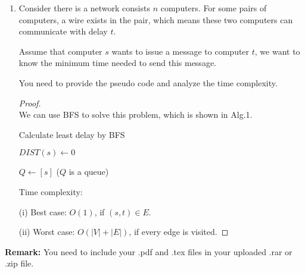 \documentclass[12pt,a4paper]{article}
\theoremstyle{definition}
\begin{document}
\begin{enumerate}
\begin{proof}
       If $(u,v)\in$ E, assume that we first visit $v$.
       
       If $u$ is not visited before, then $PRE(u)\textgreater PRE(v)$ and $POST(v)\textgreater PRE(u)$ since we call $EXPLORE(G,u)$ in $EXPLORE(G,v)$. So $[PRE(u),POST(u)]$ is contained  within    
       
       $[PRE(v),POST(v)]$.
       
       We can get the same conclusion when $u$ is visited first. So the lemma is proved.
    \end{proof}
\item
Consider there is a network consists $n$ computers. For some pairs of computers, a wire exists in the pair, which means these two computers can communicate with delay $t$.\par
Assume that computer $s$ wants to issue a message to computer $t$, we want to know the minimum time needed to send this message.\par
You need to provide the pseudo code and analyze the time complexity.\par

    \begin{proof}
       ~\\
       We can use BFS to solve this problem, which is shown in Alg.1.
       
        \begin{minipage}[t]{0.9\textwidth}
       	\begin{algorithm}[H]
       		\BlankLine
       		\caption{Calculate least delay by BFS}
       		\label{Alg-selectionsort}
       		\BlankLine
       		
       		$DIST(s)\leftarrow0$
       		
       		$Q\leftarrow[s]$ ($Q$ is a queue)
       		
       	\end{algorithm}
       
       Time complexity:
       
       (i) Best case: $O(1)$, if $(s,t)\in E$.
       
       (ii) Worst case: $O(|V|+|E|)$, if every edge is visited.
       \end{minipage}
   \end{proof}


    

\end{enumerate}

\vspace{20pt}

\textbf{Remark:} You need to include your .pdf and .tex files in your uploaded .rar or .zip file.

\end{document}
